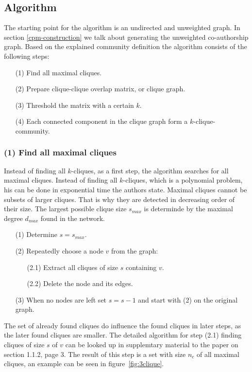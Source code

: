 \documentclass[runningheads,a4paper]{llncs}
\begin{document}
\subsection{Algorithm}
\label{cpm-algo}
The starting point for the algorithm is an undirected and unweighted graph. In section \ref{cpm-construction} we talk about generating the  unweighted co-authorship graph.
Based on the explained community definition the algorithm consists of the following steps:

\begin{enumerate}
\small
\item[(1)] Find all maximal cliques.
\item[(2)] Prepare clique-clique overlap matrix, or clique graph.
\item[(3)] Threshold the matrix with a certain $k$.
\item[(4)] Each connected component in the clique graph form a $k$-clique-community.
\end{enumerate}

\subsubsection{(1) Find all maximal cliques}
Instead of finding all $k$-cliques, as a first step, the algorithm searches for all maximal cliques. Instead of finding all $k$-cliques, which is a polynomial problem, his can be done in exponential time the authors state.
Maximal cliques cannot be subsets of larger cliques.
That is why they are detected in decreasing order of their size.
The largest possible clique size $s_{max}$ is determinde by the maximal degree $d_{max}$ found in the network.

\begin{enumerate}
\small
\item[(1)] Determine $s=s_{max}$.
\item[(2)] Repeatedly choose a node $v$ from the graph:
	\begin{enumerate}
		\item[(2.1)] Extract all cliques of size $s$ containing $v$.
		\item[(2.2)] Delete the node and its edges.
	\end{enumerate}
\item[(3)] When no nodes are left set $s=s-1$ and start with (2) on the original graph.
\end{enumerate}

The set of already found cliques do influence the found cliques in later steps, as the later found cliques are smaller.
The detailed algorithm for step (2.1) finding cliques of size $s$ of $v$ can be looked up in supplemtary material to the paper on section 1.1.2, page 3.
The result of this step is a set with size $n_c$ of all maximal cliques, an example can be seen in figure~\ref{fig:3clique}.
\end{document}
